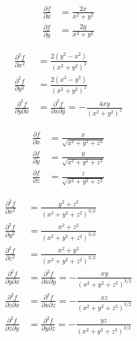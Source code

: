 
\begin{tanswer}
\begin{align*}
    \frac{\partial f}{\partial x} &= \frac{2x}{x^2+y^2} \\
    \frac{\partial f}{\partial y} &= \frac{2y}{x^2+y^2}
\end{align*}

\begin{align*}
    \frac{\partial^2 f}{\partial x^2} &= \frac{2(y^2-x^2)}{(x^2+y^2)^2} \\
    \frac{\partial^2 f}{\partial y^2} &= \frac{2(x^2-y^2)}{(x^2+y^2)^2} \\
    \frac{\partial^2 f}{\partial y \partial x} &= \frac{\partial^2 f}{\partial x \partial y} = -\frac{4xy}{(x^2+y^2)^2}
\end{align*}
\end{tanswer}

\begin{tanswer}
\begin{align*}
    \frac{\partial f}{\partial x} &= \frac{x}{\sqrt{x^2+y^2+z^2}} \\
    \frac{\partial f}{\partial y} &= \frac{y}{\sqrt{x^2+y^2+z^2}} \\
    \frac{\partial f}{\partial z} &= \frac{z}{\sqrt{x^2+y^2+z^2}}
\end{align*}

\begin{align*}
    \frac{\partial^2 f}{\partial x^2} &= \frac{y^2+z^2}{(x^2+y^2+z^2)^{3/2}} \\
    \frac{\partial^2 f}{\partial y^2} &= \frac{x^2+z^2}{(x^2+y^2+z^2)^{3/2}} \\
    \frac{\partial^2 f}{\partial z^2} &= \frac{x^2+y^2}{(x^2+y^2+z^2)^{3/2}} \\
    \frac{\partial^2 f}{\partial y \partial x} &= \frac{\partial^2 f}{\partial x \partial y} = -\frac{xy}{(x^2+y^2+z^2)^{3/2}} \\
    \frac{\partial^2 f}{\partial z \partial x} &= \frac{\partial^2 f}{\partial x \partial z} = -\frac{xz}{(x^2+y^2+z^2)^{3/2}} \\
    \frac{\partial^2 f}{\partial z \partial y} &= \frac{\partial^2 f}{\partial y \partial z} = -\frac{yz}{(x^2+y^2+z^2)^{3/2}}
\end{align*}
\end{tanswer}


